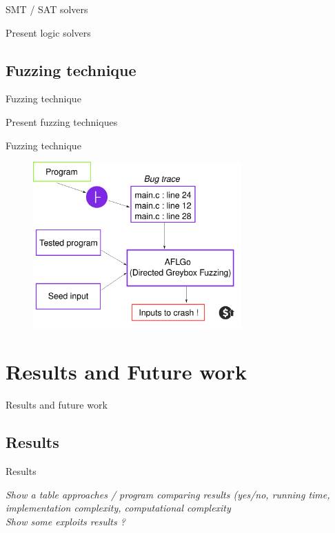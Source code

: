 \documentclass{beamer}
\begin{document}
\begin{frame}{SMT / SAT solvers}

Present logic solvers

\end{frame}



\subsection{Fuzzing technique}

\begin{frame}{Fuzzing technique}

Present fuzzing techniques

\end{frame}

\begin{frame}{Fuzzing technique}

\begin{figure}
\includegraphics[width=8cm]{Figures/Fuzzing.png}
\end{figure}

\end{frame}


\section{Results and Future work}

\begin{frame}
\centering

Results and future work
\end{frame}

\subsection{Results}

\begin{frame}{Results}

\textit{Show a table approaches / program comparing results (yes/no, running time, implementation complexity, computational complexity } \\
\textit{Show some exploits results ?}

\end{frame}
\end{document}
